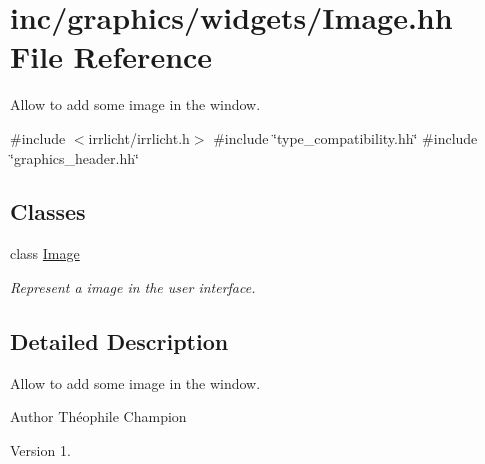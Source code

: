 \hypertarget{Image_8hh}{}\section{inc/graphics/widgets/\+Image.hh File Reference}
\label{Image_8hh}


Allow to add some image in the window.  


{\ttfamily \#include $<$irrlicht/irrlicht.\+h$>$}\newline
{\ttfamily \#include \char`\"{}type\+\_\+compatibility.\+hh\char`\"{}}\newline
{\ttfamily \#include \char`\"{}graphics\+\_\+header.\+hh\char`\"{}}\newline
\subsection*{Classes}
\begin{DoxyCompactItemize}
\item 
class \hyperlink{classImage}{Image}
\begin{DoxyCompactList}\small\item\em Represent a image in the user interface. \end{DoxyCompactList}\end{DoxyCompactItemize}


\subsection{Detailed Description}
Allow to add some image in the window. 

\begin{DoxyAuthor}{Author}
Théophile Champion 
\end{DoxyAuthor}
\begin{DoxyVersion}{Version}
1. 
\end{DoxyVersion}

